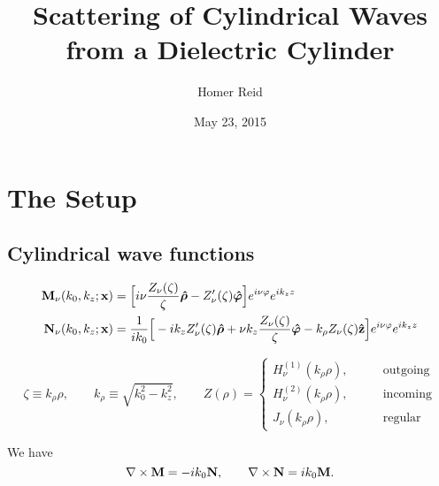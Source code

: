 \documentclass[letterpaper]{article}
\title {Scattering of Cylindrical Waves from a Dielectric Cylinder}
\author {Homer Reid}
\date {May 23, 2015}
\newcommand{\vbhatt}[1]{\boldsymbol{\hat #1}}
\begin{document}
\pagestyle{myheadings}
\maketitle

\tableofcontents

\newpage
\section{The Setup}

\subsection{Cylindrical wave functions}

\begin{align*}
 \vb M_{\nu}(k_0, k_z; \vb x)
   &= \Big[   i\nu\frac{Z_\nu(\zeta)}{\zeta}\vbhatt{\rho} 
                  - Z_\nu^\prime(\zeta) \vbhatt{\varphi} 
      \Big]e^{i\nu\varphi} e^{ik_z z} 
\\
 \vb N_\nu(k_0, k_z; \vb x) 
&=\frac{1}{ik_0}
      \Big[ -ik_z Z_\nu^\prime(\zeta)          \vbhatt{\rho}
            +\nu k_z \frac{Z_\nu(\zeta)}{\zeta} \vbhatt{\varphi}
            - k_\rho Z_\nu(\zeta)\vbhat{z}
      \Big] e^{i\nu\varphi} e^{ik_z z} 
\end{align*}

$$ 
 \zeta \equiv k_\rho \rho,
 \qquad
 k_\rho\equiv \sqrt{k_0^2 - k_z^2},
 \qquad
 Z(\rho) =
 \begin{cases}
   H^{(1)}_\nu(k_\rho \rho), \qquad &\text{outgoing} \\
   H^{(2)}_\nu(k_\rho \rho), \qquad &\text{incoming} \\
   J_\nu      (k_\rho \rho), \qquad &\text{regular}
 \end{cases}
$$

We have 
$$ \nabla \times \mathbf{M} = -ik_0 \mathbf{N}, 
   \qquad 
   \nabla \times \mathbf{N} = ik_0 \mathbf{M}.
$$
\end{document}
